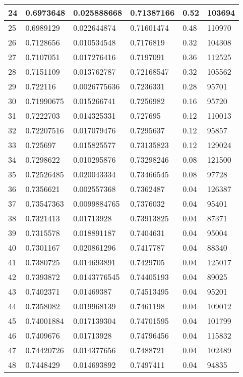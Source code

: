 \begin{longtable}{|l|l|l|l|l|l|}
24 & 0.6973648 & 0.025888668 & 0.71387166 & 0.52 & 103694 \\ \hline 
25 & 0.6989129 & 0.022644874 & 0.71601474 & 0.48 & 110970 \\ \hline 
26 & 0.7128656 & 0.010534548 & 0.7176819 & 0.32 & 104308 \\ \hline 
27 & 0.7107051 & 0.017276416 & 0.7197091 & 0.36 & 112525 \\ \hline 
28 & 0.7151109 & 0.013762787 & 0.72168547 & 0.32 & 105562 \\ \hline 
29 & 0.722116 & 0.0026775636 & 0.7236331 & 0.28 & 95701 \\ \hline 
30 & 0.71990675 & 0.015266741 & 0.7256982 & 0.16 & 95720 \\ \hline 
31 & 0.7222703 & 0.014325331 & 0.727695 & 0.12 & 110013 \\ \hline 
32 & 0.72207516 & 0.017079476 & 0.7295637 & 0.12 & 95857 \\ \hline 
33 & 0.725697 & 0.015825577 & 0.73135823 & 0.12 & 129024 \\ \hline 
34 & 0.7298622 & 0.010295876 & 0.73298246 & 0.08 & 121500 \\ \hline 
35 & 0.72526485 & 0.020043334 & 0.73466545 & 0.08 & 97728 \\ \hline 
36 & 0.7356621 & 0.002557368 & 0.7362487 & 0.04 & 126387 \\ \hline 
37 & 0.73547363 & 0.0099884765 & 0.7376032 & 0.04 & 95401 \\ \hline 
38 & 0.7321413 & 0.01713928 & 0.73913825 & 0.04 & 87371 \\ \hline 
39 & 0.7315578 & 0.018891187 & 0.7404631 & 0.04 & 95004 \\ \hline 
40 & 0.7301167 & 0.020861296 & 0.7417787 & 0.04 & 88340 \\ \hline 
41 & 0.7380725 & 0.014693891 & 0.7429705 & 0.04 & 125017 \\ \hline 
42 & 0.7393872 & 0.0143776545 & 0.74405193 & 0.04 & 89025 \\ \hline 
43 & 0.7402371 & 0.01469387 & 0.74513495 & 0.04 & 95201 \\ \hline 
44 & 0.7358082 & 0.019968139 & 0.7461198 & 0.04 & 109012 \\ \hline 
45 & 0.74001884 & 0.017139304 & 0.74701595 & 0.04 & 101799 \\ \hline 
46 & 0.7409676 & 0.01713928 & 0.74796456 & 0.04 & 115832 \\ \hline 
47 & 0.74420726 & 0.014377656 & 0.7488721 & 0.04 & 102489 \\ \hline 
48 & 0.7448429 & 0.014693892 & 0.7497411 & 0.04 & 94835 \\ \hline 

\end{longtable}
